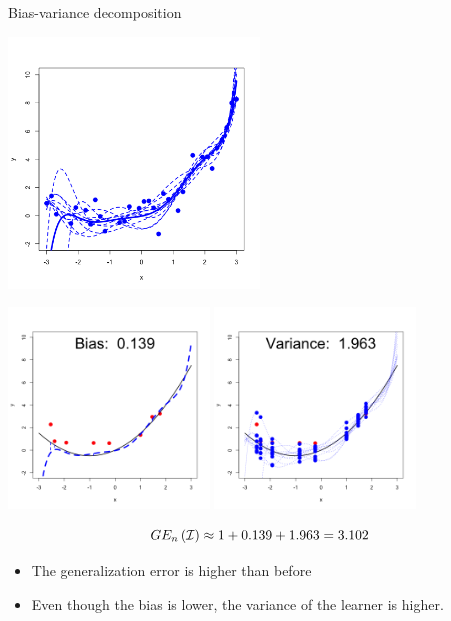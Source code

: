 \documentclass[11pt,compress,t,notes=noshow, xcolor=table]{beamer}
\begin{document}
\begin{vbframe} {Bias-variance decomposition}
\begin{center}
  \includegraphics[width = 0.5\textwidth]{figure/bias_variance_decomposition-complex_model.png}
\end{center}


\framebreak

\begin{center}
  \includegraphics[width = 0.4\textwidth]{figure/bias_variance_decomposition-complex_model_bias.png}
  \includegraphics[width = 0.4\textwidth]{figure/bias_variance_decomposition-complex_model_variance.png}
\end{center}

$$GE_n\left(\mathcal{I}\right) \approx 1 + 0.139 + 1.963 = 3.102 $$

\begin{itemize}
  \item The generalization error is higher than before
  \item Even though the bias is lower, the variance of the learner is higher. 
\end{itemize}




\end{vbframe}
\end{document}
